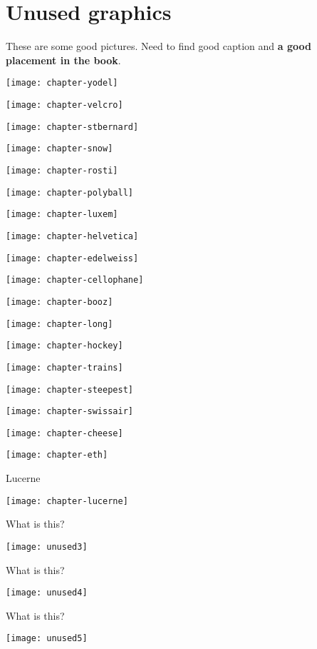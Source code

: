\section{Unused graphics}

These are some good pictures. Need to find good caption and \textbf{a good placement in the book}.

\texttt{[image: chapter-yodel]}

\texttt{[image: chapter-velcro]}

\texttt{[image: chapter-stbernard]}

\texttt{[image: chapter-snow]}

\texttt{[image: chapter-rosti]}

\texttt{[image: chapter-polyball]}

\texttt{[image: chapter-luxem]}

\texttt{[image: chapter-helvetica]}

\texttt{[image: chapter-edelweiss]}

\texttt{[image: chapter-cellophane]}

\texttt{[image: chapter-booz]}

\texttt{[image: chapter-long]}

\texttt{[image: chapter-hockey]}

\texttt{[image: chapter-trains]}

\texttt{[image: chapter-steepest]}

\texttt{[image: chapter-swissair]}

\texttt{[image: chapter-cheese]}

\texttt{[image: chapter-eth]}

Lucerne

\texttt{[image: chapter-lucerne]}

What is this?

\texttt{[image: unused3]}

What is this?

\texttt{[image: unused4]}

What is this?

\texttt{[image: unused5]}

